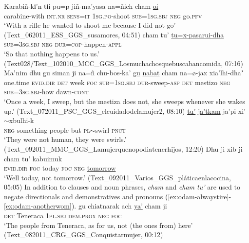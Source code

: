 \documentclass[output=paper]{langsci/langscibook}
\begin{document}
\ea
\label{ex:odam-karabin}
\gll Karabiñ-kɨ’n 		tɨi 		pu=p 		jiñ-ma’yasa na=ñich 		cham	\underline{oi}\\
carabine-with 	\textsc{int.nr} 	\textsc{sens=it} 	\textsc{1sg.po}-shoot \textsc{sub=1sg.sbj} 	\textsc{neg} 	go.\textsc{pfv}\\
\glt ‘With a rifle he wanted to shoot me because I did not go’ (Text\_062011\_ESS\_GGS\_susamores, 04:51)
\z 
\ea
\label{ex:odam-happenap} 
 	{cham tu’} 	\underline{tu=x-pasarui-dha}\\
	\textsc{sub=3sg.sbj}	\textsc{neg}		\textsc{dur=cop}-happen-\textsc{appl}\\
\glt ‘So that nothing happens to us.’ (Text028/Text\_102010\_MCC\_GGS\_Losmuchachosquebuscabancomida, 07:16)
\z 
\ea
\label{ex:odam-mestiza}
\gll Maʼnim	dhu 		gu 	siman	ji 	na=ñ chu-bos-ka’		\underline{gu}	\underline{nabat} 		cham	na=\o-jax		xia’lhi-dhaʼ\\
one.time 	\textsc{evid.dir} 	\textsc{det} 	week 	\textsc{foc} 	\textsc{sub=1sg.sbj} 	\textsc{dur}-sweep-\textsc{asp}	\textsc{det} 	mestizo 	\textsc{neg} 	\textsc{sub=3sg.sbj}-how 	dawn-\textsc{cont}\\
\glt ‘Once a week, I sweep, but the mestiza does not, she sweeps whenever she wakes up.’ (Text\_072011\_PSC\_GGS\_elcuidadodelamujer2, 08:10)
\z 
\ea
\label{ex:odam-human}
	\underline{tu’} 		\underline{ja’tkam}	ja’pi 	xi’$\sim$xbulhi-k\\
\textsc{neg} 		something 	people 		but 	\textsc{pl}$\sim$swirl-\textsc{pnct}\\
\glt ‘They were not human, they were swirls.’ (Text\_092011\_MMC\_GGS\_Lamujerquenopodiatenerhijos, 12:20)
\z 
\ea
\label{ex:odam-notoday}
\gll Dhu 	ji 	xib 	ji 	{cham tu'} 	kabuimuk\\
\textsc{evid.dir}	\textsc{foc}	today	\textsc{foc} 	\textsc{neg}		\underline{tomorrow}\\
\glt ‘Well today, not tomorrow.’ (Text\_092011\_Varios\_GGS\_pláticaenlacocina, 05:05)
\z 
In addition to clauses and noun phrases, \emph{cham} and \emph{cham tu’} are used to negate directionals and demonstratives  and pronouns (\ref{ex:odam-alwaystire}-\ref{ex:odam-anotherwom}).
\ea
\label{ex:odam-teneraca}
\gll gu 	chiatnarak 	ach 		\underline{ya’} 	cham 	ji\\
\textsc{det} 	Teneraca 	\textsc{1pl.sbj} 	\textsc{dem.prox} 	\textsc{neg} 	\textsc{foc}\\
\glt ‘The people from Teneraca, as for us, not (the ones from) here’ (Text\_082011\_CRG\_GGS\_Conquistarmujer, 00:12)
\end{document}
